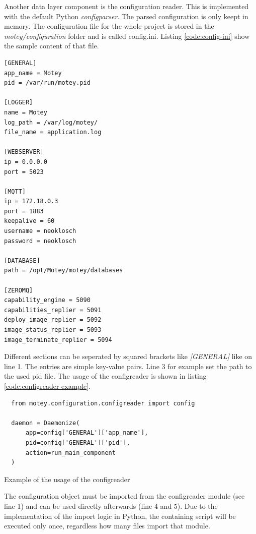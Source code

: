 Another data layer component is the configuration reader.
This is implemented with the default Python \textit{configparser}.
The parsed configuration is only keept in memory.
The configuration file for the whole project is stored in the \textit{motey/configuration} folder and is called config.ini.
Listing \ref{code:config-ini} show the sample content of that file.
\begin{verbatim}
[GENERAL]
app_name = Motey
pid = /var/run/motey.pid

[LOGGER]
name = Motey
log_path = /var/log/motey/
file_name = application.log

[WEBSERVER]
ip = 0.0.0.0
port = 5023

[MQTT]
ip = 172.18.0.3
port = 1883
keepalive = 60
username = neoklosch
password = neoklosch

[DATABASE]
path = /opt/Motey/motey/databases

[ZEROMQ]
capability_engine = 5090
capabilities_replier = 5091
deploy_image_replier = 5092
image_status_replier = 5093
image_terminate_replier = 5094
\end{verbatim}
\vspace{0.5cm}
Different sections can be seperated by squared brackets like \textit{[GENERAL]} like on line 1.
The entries are simple key-value pairs.
Line 3 for example set the path to the used pid file.
The usage of the configreader is shown in listing \ref{code:configreader-example}.

\begin{listing}[H]
  \begin{verbatim}
  from motey.configuration.configreader import config

  daemon = Daemonize(
      app=config['GENERAL']['app_name'],
      pid=config['GENERAL']['pid'],
      action=run_main_component
  )
  \end{verbatim}
  \caption{Example of the usage of the configreader}
  \label{code:configreader-example}
\end{listing}
The configuration object must be imported from the configreader module (see line 1) and can be used directly afterwards (line 4 and 5).
Due to the implementation of the import logic in Python, the containing script will be executed only once, regardless how many files import that module.

